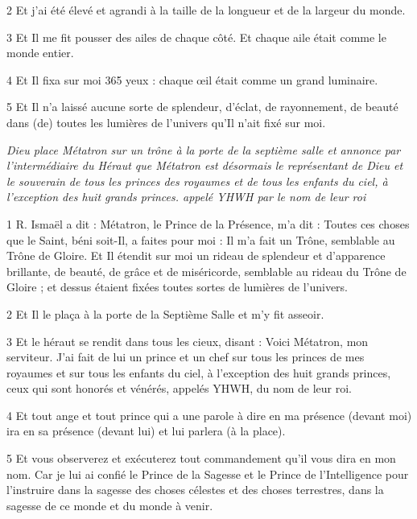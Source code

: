 \par 2 Et j'ai été élevé et agrandi à la taille de la longueur et de la largeur du monde.

\par 3 Et Il me fit pousser des ailes de chaque côté. Et chaque aile était comme le monde entier.

\par 4 Et Il fixa sur moi 365 yeux : chaque œil était comme un grand luminaire.

\par 5 Et Il n'a laissé aucune sorte de splendeur, d'éclat, de rayonnement, de beauté dans (de) toutes les lumières de l'univers qu'Il n'ait fixé sur moi.


\par \textit{Dieu place Métatron sur un trône à la porte de la septième salle et annonce par l'intermédiaire du Héraut que Métatron est désormais le représentant de Dieu et le souverain de tous les princes des royaumes et de tous les enfants du ciel, à l'exception des huit grands princes. appelé YHWH par le nom de leur roi}

\par 1 R. Ismaël a dit : Métatron, le Prince de la Présence, m'a dit : Toutes ces choses que le Saint, béni soit-Il, a faites pour moi : Il m'a fait un Trône, semblable au Trône de Gloire. Et Il étendit sur moi un rideau de splendeur et d'apparence brillante, de beauté, de grâce et de miséricorde, semblable au rideau du Trône de Gloire ; et dessus étaient fixées toutes sortes de lumières de l’univers.

\par 2 Et Il le plaça à la porte de la Septième Salle et m'y fit asseoir.

\par 3 Et le héraut se rendit dans tous les cieux, disant : Voici Métatron, mon serviteur. J'ai fait de lui un prince et un chef sur tous les princes de mes royaumes et sur tous les enfants du ciel, à l'exception des huit grands princes, ceux qui sont honorés et vénérés, appelés YHWH, du nom de leur roi.

\par 4 Et tout ange et tout prince qui a une parole à dire en ma présence (devant moi) ira en sa présence (devant lui) et lui parlera (à la place).

\par 5 Et vous observerez et exécuterez tout commandement qu'il vous dira en mon nom. Car je lui ai confié le Prince de la Sagesse et le Prince de l'Intelligence pour l'instruire dans la sagesse des choses célestes et des choses terrestres, dans la sagesse de ce monde et du monde à venir.

